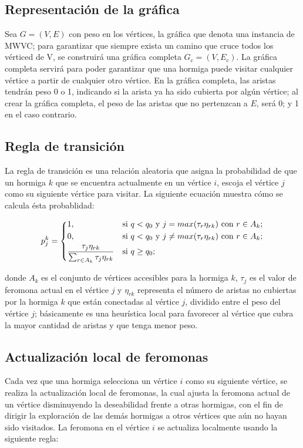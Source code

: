 \documentclass[12pt, letterpaper]{article}
\begin{document}
\subsection{Representación de la gráfica}
Sea $G=(V,E)$ con peso en los vértices, la gráfica que denota una instancia de MWVC; para garantizar que siempre exista un camino que cruce todos los vérticed de V, se construirá una gráfica completa $G_c=(V, E_c)$. La gráfica completa servirá para poder garantizar que una hormiga puede visitar cualquier vértice a partir de cualquier otro vértice. En la gráfica completa, las aristas tendrán peso 0 o 1, indicando si la arista ya ha sido cubierta por algún vértice; al crear la gráfica completa, el peso de las aristas que no pertenzcan a $E$, será 0; y 1 en el caso contrario.

\subsection{Regla de transición}
La regla de transición es una relación aleatoria que asigna la probabilidad de que un hormiga $k$ que se encuentra actualmente en un vértice $i$, escoja el vértice $j$ como su siguiente vértice para visitar. La siguiente ecuación muestra cómo se calcula ésta probablidad:

\begin{equation}
p^k_{j} = \begin{dcases}
    1, & \text{si } q < q_0 \text{ y } j = max(\tau_{r}\eta_{rk}) \text{ con } r \in A_k;\\
    0, & \text{si } q < q_0 \text{ y } j \neq max(\tau_{r}\eta_{rk}) \text{ con } r \in A_k;\\
    \frac{\tau_{j}\eta_{rk}}{\sum_{r \in A_k} \tau_{j}\eta_{rk}} & \text{si } q \geq q_0;
    \end{dcases}
\end{equation}

\noindent
donde $A_k$ es el conjunto de vértices accesibles para la hormiga $k$, $\tau_{j}$ es el valor de feromona actual en el vértice $j$ y $\eta_{rk}$ representa el número de aristas no cubiertas por la hormiga $k$ que están conectadas al vértice $j$, dividido entre el peso del vértice $j$; básicamente es una heurística local para favorecer al vértice que cubra la mayor cantidad de aristas y que tenga menor peso.

\subsection{Actualización local de feromonas}
Cada vez que una hormiga selecciona un vértice $i$ como su siguiente vértice, se realiza la actualización local de feromonas, la cual ajusta la feromona actual de un vértice disminuyendo la deseabilidad frente a otras hormigas, con el fin de dirigir la exploración de las demás hormigas a otros vértices que aún no hayan sido visitados.
La feromona en el vértice $i$ se actualiza localmente usando la siguiente regla:
\end{document}
